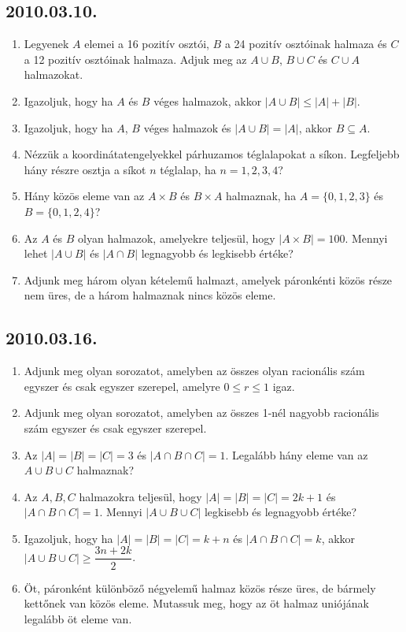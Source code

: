 \documentclass{article}
\begin{document}
\subsection*{2010.03.10.}
\begin{enumerate}
\item Legyenek $A$ elemei a 16 pozitív osztói, $B$ a 24 pozitív osztóinak halmaza és $C$ a 12 pozitív osztóinak halmaza. Adjuk meg az $A\cup B$, $B\cup C$ és $C\cup A$ halmazokat.
\item Igazoljuk, hogy ha $A$ és $B$ véges halmazok, akkor $|A\cup B|\le |A|+|B|$.
\item Igazoljuk, hogy ha $A$, $B$ véges halmazok és $|A\cup B|=|A|$, akkor 
$B\subseteq A$. 
\item Nézzük a koordinátatengelyekkel párhuzamos téglalapokat a síkon. Legfeljebb hány részre osztja a síkot $n$ téglalap, ha $n=1, 2, 3, 4$?
\item Hány közös eleme van az $A\times B$ és $B\times A$ halmaznak, ha 
$A=\{0,1,2,3\}$ és $B=\{0,1,2,4\}$?
\item Az $A$ és $B$ olyan halmazok, amelyekre teljesül, hogy $|A\times B|=100$. Mennyi lehet $|A\cup B|$ és $|A\cap B|$ legnagyobb és legkisebb értéke? 
\item Adjunk meg három olyan kételemű halmazt, amelyek páronkénti közös része nem üres, de a három halmaznak nincs közös eleme.
\end{enumerate}
\subsection*{2010.03.16.}
\begin{enumerate}
\item  Adjunk meg olyan sorozatot, amelyben az összes olyan racionális szám egyszer és csak egyszer szerepel, amelyre $0\le r \le 1$ igaz.
\item Adjunk meg olyan sorozatot, amelyben az összes 1-nél nagyobb racionális szám egyszer és csak egyszer szerepel.
\item Az $|A|=|B|=|C|=3$ és $|A\cap B\cap C|=1$. Legalább hány eleme van az $A\cup B\cup C$ halmaznak?
\item Az $A,B,C$ halmazokra teljesül, hogy $|A|=|B|=|C|=2k+1$ és $|A\cap B\cap C|=1$. Mennyi $|A\cup B\cup C|$ legkisebb és legnagyobb értéke?
\item Igazoljuk, hogy ha $|A|=|B|=|C|=k+n$ és $|A\cap B\cap C|=k$, akkor 
$|A\cup B\cup C|\ge\dfrac{3n+2k}{2}$.
\item Öt, páronként különböző négyelemű halmaz közös része üres, de bármely kettőnek van közös eleme. Mutassuk meg, hogy az öt halmaz uniójának legalább öt eleme van.
\end{enumerate}
\end{document}
